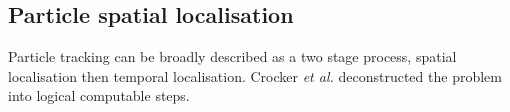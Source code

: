 

%

\subsection{Particle spatial localisation}

Particle tracking can be broadly described as a two stage process, spatial localisation then temporal localisation.
Crocker \emph{et al.} deconstructed the problem into logical computable steps.

